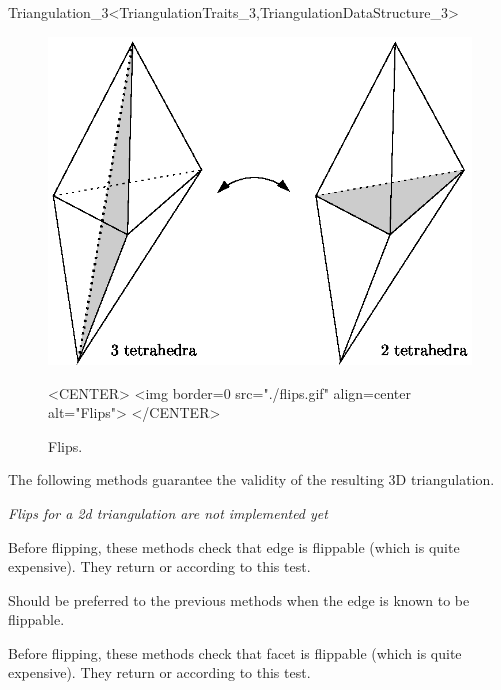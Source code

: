 \begin{ccRefClass}{Triangulation_3<TriangulationTraits_3,TriangulationDataStructure_3>}
\begin{figure}
\begin{ccTexOnly}
\begin{center} 
\includegraphics{flips.eps}
\end{center}
\end{ccTexOnly}
\caption{Flips.
\label{Triangulation3-fig-flips}}
\begin{ccHtmlOnly}
<CENTER>
<img border=0 src="./flips.gif" align=center
alt="Flips">
</CENTER>
\end{ccHtmlOnly}
\end{figure} 

The following methods guarantee the validity of the resulting 3D
triangulation.

\textit{Flips for a 2d triangulation are not implemented yet}

\ccGlue
{}
{Before flipping, these methods check that edge  is
flippable (which is quite expensive). They return  or
 according to this test.}

\ccGlue
{}
{Should be preferred to the previous methods when the edge is
known to be flippable.
}

\ccGlue
{}
{Before flipping, these methods check that facet  is
flippable (which is quite expensive). They return  or
 according to this test.} 


\end{ccRefClass}
